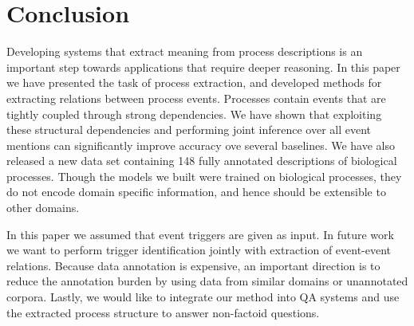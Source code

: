 \section{Conclusion}

Developing systems that extract meaning from process descriptions is an important step towards applications that require deeper reasoning. In this paper we have presented the task of process extraction, and developed methods for extracting relations between process events. Processes contain events that are  tightly coupled through strong dependencies. We have shown that  exploiting these structural dependencies and performing joint inference over all event mentions can significantly improve accuracy ove several baselines. We have also released a new data set containing 148 fully annotated descriptions of biological processes. Though the models we built were trained on biological processes, they do not encode domain specific information, and hence should be extensible to other domains.

In this paper we assumed that event triggers are given as input. In future work we want to perform trigger identification jointly with extraction of event-event relations. Because data annotation is expensive, an important direction is to reduce the annotation burden by using data from similar domains or unannotated corpora. Lastly, we would like to integrate our method into QA systems and use the extracted process structure to answer non-factoid questions. 
